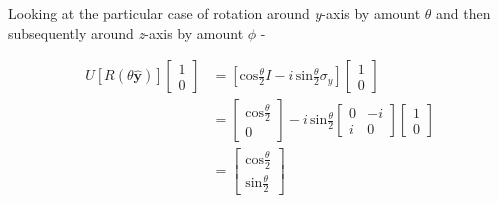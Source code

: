 \begin{alphaparts}
Looking at the particular case of rotation around \textit{y}-axis by amount $\theta$ and then subsequently around \textit{z}-axis by amount $\phi$ - 

\begin{equation*}
    \begin{split}
        U[R(\theta\hat{\mathbf{y}})]
        \begin{bmatrix}
            1 \\
            0
        \end{bmatrix} & = \left[ \textrm{cos}\frac{\theta}{2}I - i \, \textrm{sin}\frac{\theta}{2}\sigma_{y}\right]
        \begin{bmatrix}
            1 \\
            0
        \end{bmatrix} \\
        & = 
        \begin{bmatrix}
            \textrm{cos}\frac{\theta}{2} \\
            0
        \end{bmatrix} - i \, \textrm{sin}\frac{\theta}{2}
        \begin{bmatrix}
            0 & -i \\
            i & 0
        \end{bmatrix}
        \begin{bmatrix}
            1 \\
            0
        \end{bmatrix} \\
        & = 
        \begin{bmatrix}
            \textrm{cos}\frac{\theta}{2} \\
            \textrm{sin}\frac{\theta}{2}
        \end{bmatrix}
    \end{split}
\end{equation*}


\end{alphaparts}
